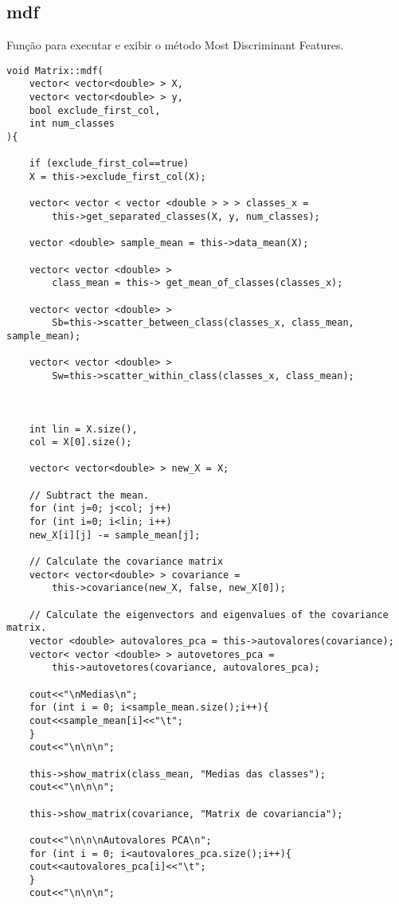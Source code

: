 \documentclass[a4paper, 11pt]{article}
\begin{document}
\subsection*{mdf}
Função para executar e exibir o método Most Discriminant Features.

\begin{lstlisting}
void Matrix::mdf(
	vector< vector<double> > X, 
	vector< vector<double> > y, 
    bool exclude_first_col, 
    int num_classes
){
                 
    if (exclude_first_col==true)
    X = this->exclude_first_col(X);

    vector< vector < vector <double > > > classes_x = 
    	this->get_separated_classes(X, y, num_classes);

    vector <double> sample_mean = this->data_mean(X);
    
    vector< vector <double> > 
    	class_mean = this-> get_mean_of_classes(classes_x);
        
    vector< vector <double> > 
    	Sb=this->scatter_between_class(classes_x, class_mean, sample_mean);
        
    vector< vector <double> > 
    	Sw=this->scatter_within_class(classes_x, class_mean);



    int lin = X.size(),
    col = X[0].size();

    vector< vector<double> > new_X = X;

    // Subtract the mean.
    for (int j=0; j<col; j++)
    for (int i=0; i<lin; i++)
    new_X[i][j] -= sample_mean[j];

    // Calculate the covariance matrix
    vector< vector<double> > covariance = 
    	this->covariance(new_X, false, new_X[0]);

    // Calculate the eigenvectors and eigenvalues of the covariance matrix.
    vector <double> autovalores_pca = this->autovalores(covariance);
    vector< vector <double> > autovetores_pca = 
    	this->autovetores(covariance, autovalores_pca);

    cout<<"\nMedias\n";
    for (int i = 0; i<sample_mean.size();i++){
    cout<<sample_mean[i]<<"\t";
    }
    cout<<"\n\n\n";

    this->show_matrix(class_mean, "Medias das classes");
    cout<<"\n\n\n";

    this->show_matrix(covariance, "Matrix de covariancia");

    cout<<"\n\n\nAutovalores PCA\n";
    for (int i = 0; i<autovalores_pca.size();i++){
    cout<<autovalores_pca[i]<<"\t";
    }
    cout<<"\n\n\n";


\end{lstlisting}
\end{document}
